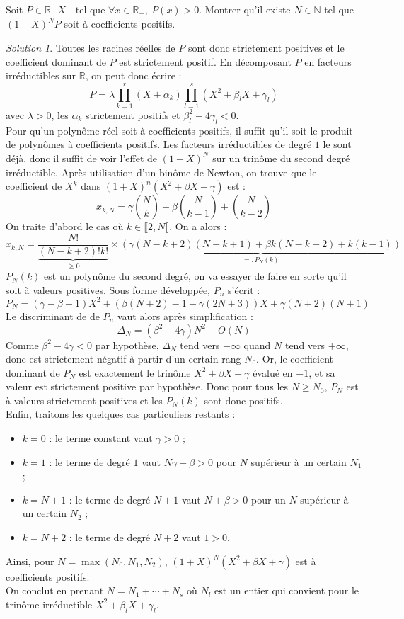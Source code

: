 \documentclass[french]{book}
\newcommand{\N}{\mathbb{N}}
\newcommand{\R}{\mathbb{R}}
\theoremstyle{definition}
\theoremstyle{remark}
\newtheorem*{sol}{Solution}
\begin{document}
\begin{exo}[3]{}
	Soit $P\in\R[X]$ tel que $\forall x\in\R_+,\ P(x)>0$. Montrer qu'il existe $N\in\N$ tel que $(1+X)^NP$ soit à coefficients positifs.
\end{exo}
\begin{sol}
	Toutes les racines réelles de $P$ sont donc strictement positives et le coefficient dominant de $P$ est strictement positif. En décomposant $P$ en facteurs irréductibles sur $\R$, on peut donc écrire : $$P=\lambda\prod_{k=1}^{r}(X+\alpha_k)\prod_{l=1}^{s}(X^2+\beta_lX+\gamma_l)$$ avec $\lambda>0$, les $\alpha_k$ strictement positifs et $\beta_l^2-4\gamma_l<0$. \\ Pour qu'un polynôme réel soit à coefficients positifs, il suffit qu'il soit le produit de polynômes à coefficients positifs. Les facteurs irréductibles de degré $1$ le sont déjà, donc il suffit de voir l'effet de $(1+X)^N$ sur un trinôme du second degré irréductible. Après utilisation d'un binôme de Newton, on trouve que le coefficient de $X^k$ dans $(1+X)^n(X^2+\beta X+\gamma)$ est : $$x_{k,N}=\gamma\binom{N}{k}+\beta\binom{N}{k-1}+\binom{N}{k-2}$$ On traite d'abord le cas où $k\in\llbracket 2,N\rrbracket$. On a alors : $$x_{k,N}=\underbrace{\frac{N!}{(N-k+2)!k!}}_{\geqslant 0}\times\underbrace{(\gamma(N-k+2)(N-k+1)+\beta k(N-k+2)+k(k-1))}_{=:P_N(k)}$$ $P_N(k)$ est un polynôme du second degré, on va essayer de faire en sorte qu'il soit à valeurs positives. Sous forme développée, $P_n$ s'écrit : $$P_N=(\gamma-\beta+1)X^2+(\beta(N+2)-1-\gamma(2N+3))X+\gamma(N+2)(N+1)$$ Le discriminant de de $P_n$ vaut alors après simplification : $$\Delta_N=(\beta^2-4\gamma)N^2+O(N)$$ Comme $\beta^2-4\gamma<0$ par hypothèse, $\Delta_N$ tend vers $-\infty$ quand $N$ tend vers $+\infty$, donc est strictement négatif à partir d'un certain rang $N_0$. Or, le coefficient dominant de $P_N$ est exactement le trinôme $X^2+\beta X+\gamma$ évalué en $-1$, et sa valeur est strictement positive par hypothèse. Donc pour tous les $N\geqslant N_0$, $P_N$ est à valeurs strictement positives et les $P_N(k)$ sont donc positifs. \\ Enfin, traitons les quelques cas particuliers restants : \begin{itemize}
		\item $k=0$ : le terme constant vaut $\gamma>0$ ;
		\item $k=1$ : le terme de degré $1$ vaut $N\gamma+\beta>0$ pour $N$ supérieur à un certain $N_1$ ;
		\item $k=N+1$ : le terme de degré $N+1$ vaut $N+\beta>0$ pour un $N$ supérieur à un certain $N_2$ ;
		\item $k=N+2$ : le terme de degré $N+2$ vaut $1>0$.
	\end{itemize}
	Ainsi, pour $N= \max(N_0,N_1,N_2)$, $(1+X)^N(X^2+\beta X+\gamma)$ est à coefficients positifs. \\ On conclut en prenant $N=N_1+\cdots+N_s$ où $N_l$ est un entier qui convient pour le trinôme irréductible $X^2+\beta_l X+\gamma_l$.
\end{sol}
\end{document}
